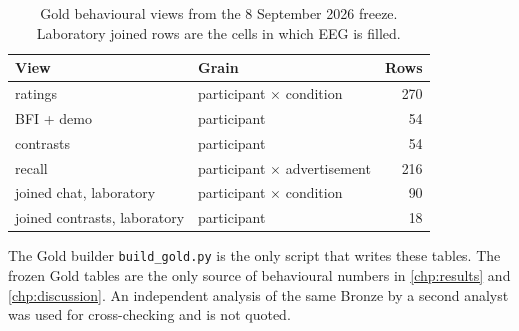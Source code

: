 \begin{table}[htbp]
\centering
\caption{Gold behavioural views from the 8 September 2026 freeze.
Laboratory joined rows are the cells in which EEG is filled.}
\label{tab:beh-gold}
\begin{tabular}{@{}llr@{}}
\toprule
\textbf{View} & \textbf{Grain} & \textbf{Rows} \\
\midrule
ratings & participant \(\times\) condition & 270 \\
BFI + demo & participant & 54 \\
contrasts & participant & 54 \\
recall & participant \(\times\) advertisement & 216 \\
joined chat, laboratory & participant \(\times\) condition & 90 \\
joined contrasts, laboratory & participant & 18 \\
\bottomrule
\end{tabular}
\end{table}
\FloatBarrier

The Gold builder \texttt{build\_gold.py} is the only script that writes these tables.
The frozen Gold tables are the only source of behavioural numbers in \autoref{chp:results} and \autoref{chp:discussion}.
An independent analysis of the same Bronze by a second analyst was used for cross-checking and is not quoted.
\\
